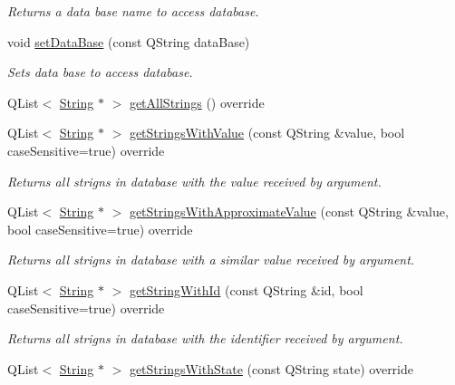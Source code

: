 \begin{DoxyCompactItemize}
\begin{DoxyCompactList}\small\item\em Returns a data base name to access database. \end{DoxyCompactList}\item 
void \mbox{\hyperlink{classMySqlConnector_a8688bfeb3bb6ba6181f5ce90dc8066d8}{set\+Data\+Base}} (const Q\+String data\+Base)
\begin{DoxyCompactList}\small\item\em Sets data base to access database. \end{DoxyCompactList}\item 
Q\+List$<$ \mbox{\hyperlink{classString}{String}} $\ast$ $>$ \mbox{\hyperlink{classMySqlConnector_ad6ff79c4049e3631800da97e8d7b7704}{get\+All\+Strings}} () override
\item 
Q\+List$<$ \mbox{\hyperlink{classString}{String}} $\ast$ $>$ \mbox{\hyperlink{classMySqlConnector_ae7440816a5bda9e63ea526656c4001f5}{get\+Strings\+With\+Value}} (const Q\+String \&value, bool case\+Sensitive=true) override
\begin{DoxyCompactList}\small\item\em Returns all strigns in database with the value received by argument. \end{DoxyCompactList}\item 
Q\+List$<$ \mbox{\hyperlink{classString}{String}} $\ast$ $>$ \mbox{\hyperlink{classMySqlConnector_a8a480141c72dc8da687b15f921ab1a4e}{get\+Strings\+With\+Approximate\+Value}} (const Q\+String \&value, bool case\+Sensitive=true) override
\begin{DoxyCompactList}\small\item\em Returns all strigns in database with a similar value received by argument. \end{DoxyCompactList}\item 
Q\+List$<$ \mbox{\hyperlink{classString}{String}} $\ast$ $>$ \mbox{\hyperlink{classMySqlConnector_a269bbced50451ff0ce48cfc4f2bb6a3b}{get\+String\+With\+Id}} (const Q\+String \&id, bool case\+Sensitive=true) override
\begin{DoxyCompactList}\small\item\em Returns all strigns in database with the identifier received by argument. \end{DoxyCompactList}\item 
Q\+List$<$ \mbox{\hyperlink{classString}{String}} $\ast$ $>$ \mbox{\hyperlink{classMySqlConnector_a821c3dcebcd763df1700881cb47685d5}{get\+Strings\+With\+State}} (const Q\+String state) override

\end{DoxyCompactItemize}
